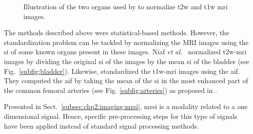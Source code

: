 \begin{figure}
\centering
	\hspace*{\fill}
	 \hfill
	\hspace*{\fill}
	\caption{Illustration of the two organs used by \cite{Niaf2011,Niaf2012} to normalize \ac{t2w} and \ac{t1w} \ac{mri} images.}
	\label{fig:niaf}
\end{figure}

The methods described above were statistical-based methods.
However, the standardization problem can be tackled by normalizing the MRI images using the \ac{si} of some known organs present in these images. 
Niaf \textit{et al.}~\cite{Niaf2011,Niaf2012} normalized \ac{t2w}-\ac{mri} images by dividing the original \ac{si} of the images by the mean \ac{si} of the bladder (see Fig.~\ref{subfig:bladder}).
Likewise, \cite{Niaf2011} standardized the \ac{t1w}-\ac{mri} images using the \ac{aif}.
They computed the \ac{aif} by taking the mean of the \ac{si} in the most enhanced part of the common femoral arteries (see Fig. \ref{subfig:arteries}) as proposed in \cite{Wiart2007}.



Presented in Sect.~\ref{subsec:chp2:imaging:mrsi}, \ac{mrsi} is a modality related to a one dimensional signal.
Hence, specific pre-processing steps for this type of signals have been applied instead of standard signal processing methods.

